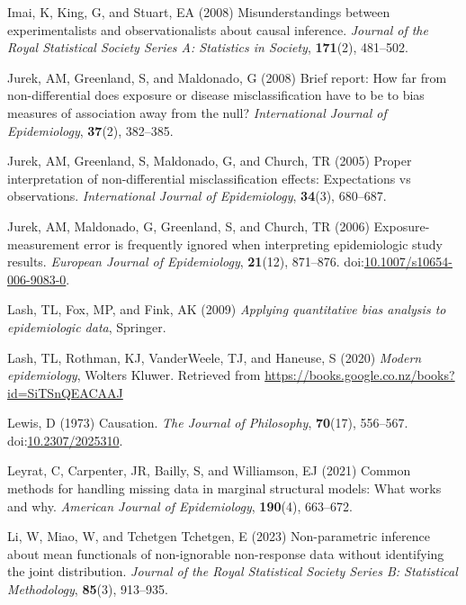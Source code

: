 \documentclass[
  single column]{article}
\newlength{\cslhangindent}
\newenvironment{CSLReferences}[2] %
 {\begin{list}{}{%
  \setlength{\itemindent}{0pt}
  \setlength{\leftmargin}{0pt}
  \setlength{\parsep}{0pt}
  \ifodd #1
   \setlength{\leftmargin}{\cslhangindent}
   \setlength{\itemindent}{-1\cslhangindent}
  \fi
  \setlength{\itemsep}{#2\baselineskip}}}
 {\end{list}}
\begin{document}
\begin{CSLReferences}{1}{0}
Imai, K, King, G, and Stuart, EA (2008) Misunderstandings between
experimentalists and observationalists about causal inference.
\emph{Journal of the Royal Statistical Society Series A: Statistics in
Society}, \textbf{171}(2), 481--502.

Jurek, AM, Greenland, S, and Maldonado, G (2008) Brief report: How far
from non-differential does exposure or disease misclassification have to
be to bias measures of association away from the null?
\emph{International Journal of Epidemiology}, \textbf{37}(2), 382--385.

Jurek, AM, Greenland, S, Maldonado, G, and Church, TR (2005) Proper
interpretation of non-differential misclassification effects:
Expectations vs observations. \emph{International Journal of
Epidemiology}, \textbf{34}(3), 680--687.

Jurek, AM, Maldonado, G, Greenland, S, and Church, TR (2006)
Exposure-measurement error is frequently ignored when interpreting
epidemiologic study results. \emph{European Journal of Epidemiology},
\textbf{21}(12), 871--876.
doi:\href{https://doi.org/10.1007/s10654-006-9083-0}{10.1007/s10654-006-9083-0}.

Lash, TL, Fox, MP, and Fink, AK (2009) \emph{Applying quantitative bias
analysis to epidemiologic data}, Springer.

Lash, TL, Rothman, KJ, VanderWeele, TJ, and Haneuse, S (2020)
\emph{Modern epidemiology}, Wolters Kluwer. Retrieved from
\url{https://books.google.co.nz/books?id=SiTSnQEACAAJ}

Lewis, D (1973) Causation. \emph{The Journal of Philosophy},
\textbf{70}(17), 556--567.
doi:\href{https://doi.org/10.2307/2025310}{10.2307/2025310}.

Leyrat, C, Carpenter, JR, Bailly, S, and Williamson, EJ (2021) Common
methods for handling missing data in marginal structural models: What
works and why. \emph{American Journal of Epidemiology}, \textbf{190}(4),
663--672.

Li, W, Miao, W, and Tchetgen Tchetgen, E (2023) Non-parametric inference
about mean functionals of non-ignorable non-response data without
identifying the joint distribution. \emph{Journal of the Royal
Statistical Society Series B: Statistical Methodology}, \textbf{85}(3),
913--935.


\end{CSLReferences}
\end{document}
